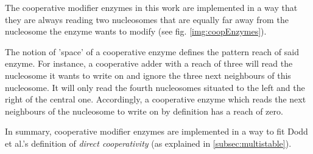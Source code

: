                 The cooperative modifier enzymes in this work are implemented in a way that they are always reading two nucleosomes that are equally far away from the nucleosome the enzyme wants to modify (see fig. \ref{img:coopEnzymes}).

                The notion of 'space' of a cooperative enzyme defines the pattern reach of said enzyme. For instance, a cooperative adder with a reach of three will read the nucleosome it wants to write on and ignore the three next neighbours of this nucleosome. It will only read the fourth nucleosomes situated to the left and the right of the central one. Accordingly, a cooperative enzyme which reads the next neighbours of the nucleosome to write on by definition has a reach of zero.

                In summary, cooperative modifier enzymes are implemented in a way to fit Dodd et al.'s definition of \textit{direct cooperativity} (as explained in \ref{subsec:multistable}).
